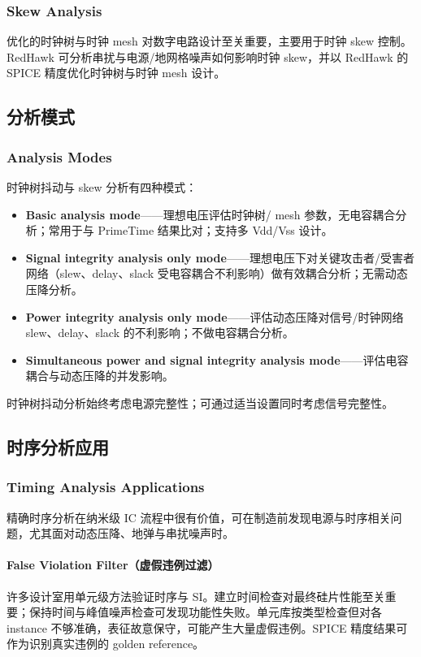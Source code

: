 \subsubsection*{Skew Analysis}

优化的时钟树与时钟 mesh 对数字电路设计至关重要，主要用于时钟 skew 控制。RedHawk 可分析串扰与电源/地网格噪声如何影响时钟 skew，并以 RedHawk 的 SPICE 精度优化时钟树与时钟 mesh 设计。

\subsection{分析模式}
\subsubsection*{Analysis Modes}

时钟树抖动与 skew 分析有四种模式：
\begin{itemize}
  \item \textbf{Basic analysis mode}——理想电压评估时钟树/ mesh 参数，无电容耦合分析；常用于与 PrimeTime 结果比对；支持多 Vdd/Vss 设计。
  \item \textbf{Signal integrity analysis only mode}——理想电压下对关键攻击者/受害者网络（slew、delay、slack 受电容耦合不利影响）做有效耦合分析；无需动态压降分析。
  \item \textbf{Power integrity analysis only mode}——评估动态压降对信号/时钟网络 slew、delay、slack 的不利影响；不做电容耦合分析。
  \item \textbf{Simultaneous power and signal integrity analysis mode}——评估电容耦合与动态压降的并发影响。
\end{itemize}

时钟树抖动分析始终考虑电源完整性；可通过适当设置同时考虑信号完整性。

\subsection{时序分析应用}
\subsubsection*{Timing Analysis Applications}

精确时序分析在纳米级 IC 流程中很有价值，可在制造前发现电源与时序相关问题，尤其面对动态压降、地弹与串扰噪声时。

\paragraph{False Violation Filter（虚假违例过滤）}
许多设计室用单元级方法验证时序与 SI。建立时间检查对最终硅片性能至关重要；保持时间与峰值噪声检查可发现功能性失败。单元库按类型检查但对各 instance 不够准确，表征故意保守，可能产生大量虚假违例。SPICE 精度结果可作为识别真实违例的 golden reference。

